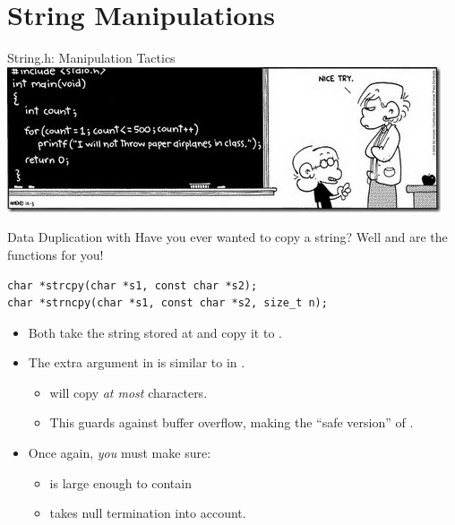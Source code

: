 \documentclass[11pt]{beamer}
\let\OldTexttt\texttt
\renewcommand{\texttt}[1]{\OldTexttt{\color{teal}{#1}}}
\begin{document}
\section[string.h]{String Manipulations}
\begin{frame}{String.h: Manipulation Tactics}
\center
\includegraphics[scale=0.8]{foxtrot.jpg}
\end{frame}

\begin{frame}[fragile=singleslide]{Data Duplication with \texttt{strcpy()}}
Have you ever wanted to copy a string?  Well \texttt{strcpy()} and \texttt{strncpy()} are the functions for you! 
\begin{lstlisting}[style = C]
char *strcpy(char *s1, const char *s2);
char *strncpy(char *s1, const char *s2, size_t n);
\end{lstlisting}
\begin{itemize}
\item Both take the string stored at \texttt{s2} and copy it to \texttt{s1}.
\item The extra argument in \texttt{strncpy()} is similar to \texttt{size} in \texttt{snprintf()}.  
\begin{itemize}
\item \texttt{strncpy()} will copy \emph{at most} \texttt{n} characters.
\item This guards against buffer overflow, making \texttt{strncpy()} the ``safe version'' of \texttt{strcpy()}.
\end{itemize}
\item Once again, \emph{you} must make sure:
\begin{itemize}
\item \texttt{s1} is large enough to contain \texttt{s2}
\item \texttt{n} takes null termination into account.  
\end{itemize}
\end{itemize}
\end{frame}
\end{document}
